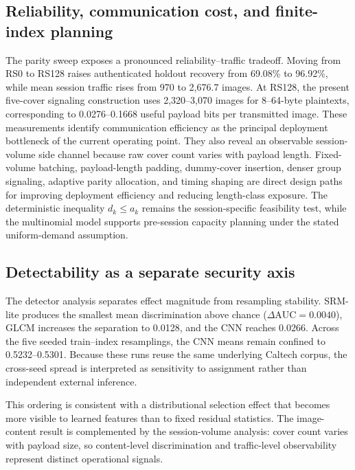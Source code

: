 \subsection{Reliability, communication cost, and finite-index planning}
The parity sweep exposes a pronounced reliability--traffic tradeoff. Moving from RS0 to RS128 raises authenticated holdout recovery from 69.08\% to 96.92\%, while mean session traffic rises from 970 to 2,676.7 images. At RS128, the present five-cover signaling construction uses 2,320--3,070 images for 8--64-byte plaintexts, corresponding to 0.0276--0.1668 useful payload bits per transmitted image. These measurements identify communication efficiency as the principal deployment bottleneck of the current operating point. They also reveal an observable session-volume side channel because raw cover count varies with payload length. Fixed-volume batching, payload-length padding, dummy-cover insertion, denser group signaling, adaptive parity allocation, and timing shaping are direct design paths for improving deployment efficiency and reducing length-class exposure. The deterministic inequality $d_k\le a_k$ remains the session-specific feasibility test, while the multinomial model supports pre-session capacity planning under the stated uniform-demand assumption.

\subsection{Detectability as a separate security axis}
The detector analysis separates effect magnitude from resampling stability. SRM-lite produces the smallest mean discrimination above chance ($\Delta\mathrm{AUC}=0.0040$), GLCM increases the separation to 0.0128, and the CNN reaches 0.0266. Across the five seeded train--index resamplings, the CNN means remain confined to 0.5232--0.5301. Because these runs reuse the same underlying Caltech corpus, the cross-seed spread is interpreted as sensitivity to assignment rather than independent external inference.

This ordering is consistent with a distributional selection effect that becomes more visible to learned features than to fixed residual statistics. The image-content result is complemented by the session-volume analysis: cover count varies with payload size, so content-level discrimination and traffic-level observability represent distinct operational signals.

